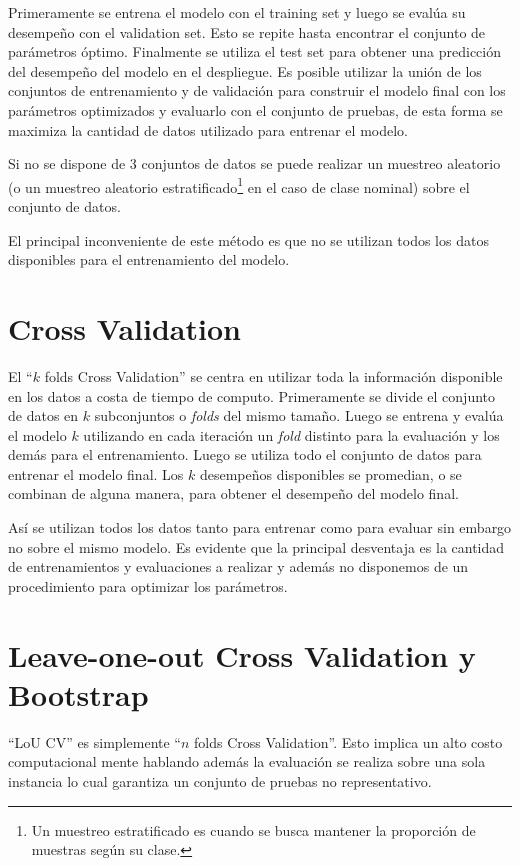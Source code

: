 \documentclass[10pt,a4paper]{article}
\begin{document}
Primeramente se entrena el modelo con el training set y luego se evalúa su desempeño con el validation set. Esto se repite hasta encontrar el conjunto de parámetros óptimo. Finalmente se utiliza el test set para obtener una predicción del desempeño del modelo en el despliegue. Es posible utilizar la unión de los conjuntos de entrenamiento y de validación para construir el modelo final con los parámetros optimizados y evaluarlo con el conjunto de pruebas, de esta forma se maximiza la cantidad de datos utilizado para entrenar el modelo.

Si no se dispone de 3 conjuntos de datos se puede realizar un muestreo aleatorio (o un muestreo aleatorio estratificado\footnote{Un muestreo estratificado es cuando se busca mantener la proporción de muestras según su clase.} en el caso de clase nominal) sobre el conjunto de datos.

El principal inconveniente de este método es que no se utilizan todos los datos disponibles para el entrenamiento del modelo.

\section{Cross Validation}
El ``$k$ folds Cross Validation''  se centra en utilizar toda la información disponible en los datos a costa de tiempo de computo. Primeramente se divide el conjunto de datos en $k$ subconjuntos o \textit{folds} del mismo tamaño. Luego se entrena y evalúa el modelo $k$ utilizando en cada iteración un \textit{fold} distinto para la evaluación y los demás para el entrenamiento. Luego se utiliza todo el conjunto de datos para entrenar el modelo final. Los $k$ desempeños disponibles se promedian, o se combinan de alguna manera, para obtener el desempeño del modelo final.

Así se utilizan todos los datos tanto para entrenar como para evaluar sin embargo no sobre el mismo modelo. Es evidente que la principal desventaja es la cantidad de entrenamientos y evaluaciones a realizar y además no disponemos de un procedimiento para optimizar los parámetros.

\section{Leave-one-out Cross Validation y Bootstrap}
``LoU CV'' es simplemente ``$n$ folds Cross Validation''. Esto implica un alto costo computacional mente hablando además la evaluación se realiza sobre una sola instancia lo cual garantiza un conjunto de pruebas no representativo.
\end{document}
